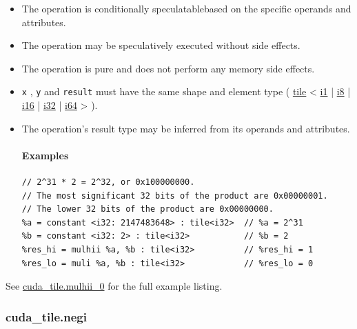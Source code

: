 \documentclass{article}
\begin{document}
\begin{itemize}
\item The operation is conditionally speculatablebased on the specific operands and attributes.
\item The operation may be speculatively executed without side effects.
\item The operation is pure and does not perform any memory side effects.
\item \texttt{x} , \texttt{y} and \texttt{result} must have the same shape and element type ( \href{https://docs.nvidia.com/cuda/tile-ir/latest/sections/types.html#type-tile}{tile} < \href{https://docs.nvidia.com/cuda/tile-ir/latest/sections/types.html#subsection-element-types}{i1} | \href{https://docs.nvidia.com/cuda/tile-ir/latest/sections/types.html#subsection-element-types}{i8} | \href{https://docs.nvidia.com/cuda/tile-ir/latest/sections/types.html#subsection-element-types}{i16} | \href{https://docs.nvidia.com/cuda/tile-ir/latest/sections/types.html#subsection-element-types}{i32} | \href{https://docs.nvidia.com/cuda/tile-ir/latest/sections/types.html#subsection-element-types}{i64} > ).
\item The operation's result type may be inferred from its operands and attributes.


\paragraph{Examples}

\begin{lstlisting}
// 2^31 * 2 = 2^32, or 0x100000000.
// The most significant 32 bits of the product are 0x00000001.
// The lower 32 bits of the product are 0x00000000.
%a = constant <i32: 2147483648> : tile<i32>  // %a = 2^31
%b = constant <i32: 2> : tile<i32>           // %b = 2
%res_hi = mulhii %a, %b : tile<i32>          // %res_hi = 1
%res_lo = muli %a, %b : tile<i32>            // %res_lo = 0
\end{lstlisting}

\end{itemize}
See \href{https://docs.nvidia.com/cuda/tile-ir/latest/sections/appendix.html#example-cuda-tile-mulhii-0}{cuda\_tile.mulhii\_0} for the full example listing.



\subsubsection{cuda\_tile.negi}
\end{document}
